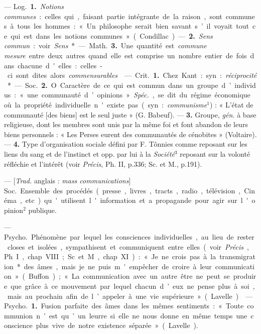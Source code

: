 \begin{itemize}[leftmargin=1cm, label=, itemsep=11pt]
 — \si{Log.} {\bf 1.} {\it Notions communes} : celles qui, faisant partie intégrante de la raison, sont communes
à tous les hommes : « Un philosophe serait bien savant s’il voyait
tout ce qui est dans les notions
communes » (Condillac). — {\bf 2.} {\it Sens
commun} : voir {\it Sens}*.

— \si{Math.} {\bf 3.} Une quantité est
{\it commune mesure} entre deux autres
quand elle est comprise un nombre
entier de fois dans chacune d'elles :
celles-ci sont dites alors {\it commensurables}.

 — \si{Crit.} {\bf 1.} Chez Kant :
syn. : {\it réciprocité}*.

— \si{Soc.} {\bf 2.} O Caractère de ce qui
est commun dans un groupe d’individus : « une communauté d’opinions ». {\it Spéc.}, se dit du régime économique où la propriété individuelle n'existe pas (syn. : {\it communisme}$^1$) : « L'état de communauté
[des biens] est le seul juste » (G. Babeuf). — {\bf 3.}  Groupe,  {\it gén.} à base
religieuse, dont les membres sont
unis par la même foi et font abandon
de leurs biens personnels : « Les
Perses eurent des communautés de
cénobites » (Voltaire). — {\bf 4.} Type
d'organisation sociale défini par
F. Tônnies comme reposant sur les
liens du sang et de l'instinct et opp.
par lui à la {\it Société}$^3$ reposant sur la
volonté réfléchie et l'intérêt (voir
{\it Précis}, Ph. II, p.336; Sc. et M., p.191).

 — [{\it Trad.} anglais : {\it mass
communications}] \si{Soc.} Ensemble des procédés (presse, livres, tracts,
radio, télévision, Cinéma, etc.) qu'utilisent l'information et a propagande
pour agir sur l'opinion$^2$ publique.

 —
\si{Psycho.} Phénomène par lequel les
consciences individuelles, au lieu de
rester closes et isolées, sympathisent
et communiquent entre elles (voir
 {\it Précis}, Ph. I, chap. VIII; Sc. et M.,
chap. XI) : « Je ne crois pas à la
transmigration* des âmes, mais je
ne puis m'empêcher de croire à leur
communication » (Buffon); « La
communication avec un autre être
ne peut se produire que grâce à ce
mouvement par lequel chacun d’eux
ne pense plus à soi, mais au prochain
afin de l’appeler à une vie supérieure » (Lavelle).

 — \si{Psycho.} {\bf 1.} Fusion parfaite des âmes dans les mêmes sentiments : « Toute communion n’est
qu’un leurre si elle ne nous donne en
même temps une conscience plus
vive de notre existence séparée »
(Lavelle).


\end{itemize}
